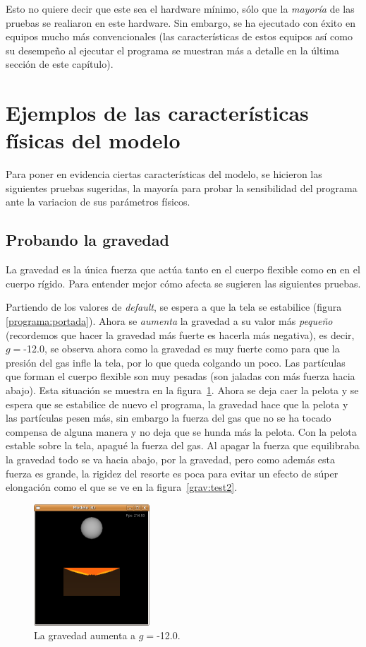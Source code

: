 Esto no quiere decir que este sea el hardware mínimo, sólo que la \emph{mayoría} de las pruebas se realiaron en este hardware.
Sin embargo, se ha ejecutado con éxito en equipos mucho más convencionales (las características de estos equipos así como su desempeño al ejecutar el programa se muestran más a detalle en la última sección de este capítulo).

\section{Ejemplos de las características físicas del modelo}
Para poner en evidencia ciertas características del modelo, se hicieron las siguientes pruebas sugeridas, la mayoría para probar la sensibilidad del programa ante la variacion de sus parámetros físicos.

\subsection{Probando la gravedad}
La gravedad es la única fuerza que actúa tanto en el cuerpo flexible como en en el cuerpo rígido. Para entender mejor cómo afecta se sugieren las siguientes pruebas.

Partiendo de los valores de \emph{\foreignlanguage{english}{default}}, se espera a que la tela se estabilice (figura \ref{programa:portada}).
Ahora se \emph{aumenta} la gravedad a su valor más \emph{pequeño} (recordemos que hacer la gravedad más fuerte es hacerla más negativa), es decir, $g=$-12.0, se observa ahora como la gravedad es muy fuerte como para que la presión del gas infle la tela, por lo que queda colgando un poco.
Las partículas que forman el cuerpo flexible son muy pesadas (son jaladas con más fuerza hacia abajo).
Esta situación se muestra en la figura~\ref{grav:test1}. 
Ahora se deja caer la pelota y se espera que se estabilice de nuevo el programa, la gravedad hace que la pelota y las partículas pesen más, sin embargo la fuerza del gas que no se ha tocado compensa de alguna manera y no deja que se hunda más la pelota.
Con la pelota estable sobre la tela, apagué la fuerza del gas.
Al apagar la fuerza que equilibraba la gravedad todo se va hacia abajo, por la gravedad, pero como además esta fuerza es grande, la rigidez del resorte es poca para evitar un efecto de súper elongación como el que se ve en la figura~\ref{grav:test2}.

\begin{figure}
 \centering
 \includegraphics[]{Img/modGra1}
 \caption[Ejecución con $g=$-12.0]{La gravedad aumenta a $g=$-12.0.}
 \label{grav:test1}
\end{figure}

